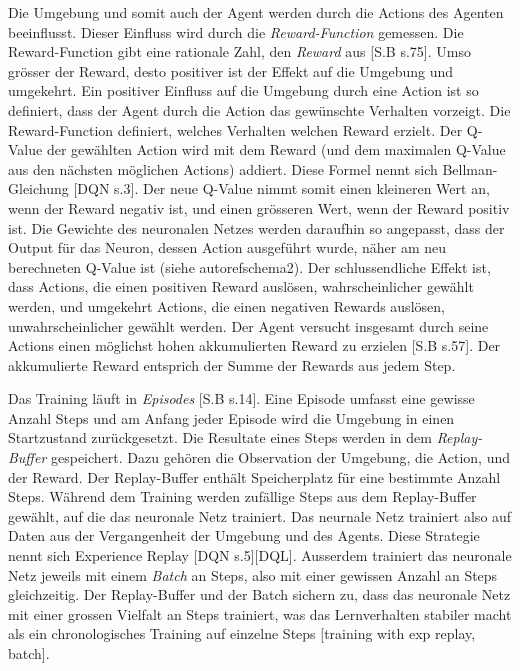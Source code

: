 
Die Umgebung und somit auch der Agent werden durch die Actions des Agenten
beeinflusst. Dieser Einfluss wird durch die \emph{Reward-Function} gemessen. Die
Reward-Function gibt eine rationale Zahl, den \emph{Reward} aus [S.B s.75]. Umso grösser
der Reward, desto positiver ist der Effekt auf die Umgebung und umgekehrt. Ein
positiver Einfluss auf die Umgebung durch eine Action ist so definiert, dass der
Agent durch die Action das gewünschte Verhalten vorzeigt. Die Reward-Function
definiert, welches Verhalten welchen Reward erzielt. Der Q-Value der gewählten
Action wird mit dem Reward (und dem maximalen Q-Value aus den nächsten möglichen
Actions) addiert. Diese Formel nennt sich Bellman-Gleichung [DQN s.3]. Der neue Q-Value          
nimmt somit einen kleineren Wert an, wenn der Reward negativ ist, und einen
grösseren Wert, wenn der Reward positiv ist. Die Gewichte des neuronalen Netzes
werden daraufhin so angepasst, dass der Output für das Neuron, dessen Action
ausgeführt wurde, näher am neu berechneten Q-Value ist (siehe autoref{schema2}).
Der schlussendliche Effekt ist, dass Actions, die einen positiven Reward
auslösen, wahrscheinlicher gewählt werden, und umgekehrt Actions, die einen
negativen Rewards auslösen, unwahrscheinlicher gewählt werden. Der Agent
versucht insgesamt durch seine Actions einen möglichst hohen akkumulierten
Reward zu erzielen [S.B s.57]. Der akkumulierte Reward entsprich der Summe der
Rewards aus jedem Step.


Das Training läuft in \emph{Episodes} [S.B s.14]. Eine Episode umfasst
eine gewisse Anzahl Steps und am Anfang jeder Episode wird die Umgebung in einen
Startzustand zurückgesetzt. Die Resultate eines Steps werden in dem
\emph{Replay-Buffer} gespeichert. Dazu gehören die Observation der Umgebung, die
Action, und der Reward. Der Replay-Buffer enthält Speicherplatz für eine
bestimmte Anzahl Steps. Während dem Training werden zufällige Steps aus dem
Replay-Buffer gewählt, auf die das neuronale Netz trainiert. Das neurnale Netz
trainiert also auf Daten aus der Vergangenheit der Umgebung und des Agents.
Diese Strategie nennt sich Experience Replay [DQN s.5][DQL]. Ausserdem trainiert
das neuronale Netz jeweils mit einem \emph{Batch} an Steps, also mit einer
gewissen Anzahl an Steps gleichzeitig. Der Replay-Buffer und der Batch sichern
zu, dass das neuronale Netz mit einer grossen Vielfalt an Steps trainiert, was
das Lernverhalten stabiler macht als ein chronologisches Training auf einzelne
Steps [training with exp replay, batch].


